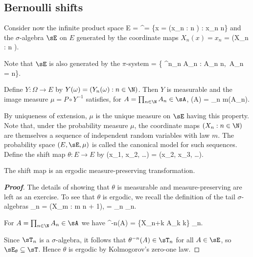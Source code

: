 
\subsection{Bernoulli shifts}


Consider now the infinite product space
\be
E = \R^\N = \{x = (x_n : n \in \N) : x_n \in \R {}n\}
\ee
and the $\sigma$-algebra $\sE$ on $E$ generated by the coordinate maps $X_n(x) = x_n$
\be
\sE = \sigma(X_n : n \in \N).
\ee


Note that $\sE$ is also generated by the $\pi$-system
\be
\sA = \left\{ \prod^n_{n \in\N} A_n : A_n \in \sB {}n,\ A_n = \R {}n\right\}.
\ee

Define $Y : \Omega \to E$ by $Y (\omega) = (Y_n(\omega) : n \in \N)$. Then $Y$ is measurable and the image measure $\mu = P \circ Y^{-1}$ satisfies, for $A = \prod_{n\in\N} A_n \in \sA$,
\be
\mu(A) = \prod_{n\in \N} m(A_n).
\ee

By uniqueness of extension, $\mu$ is the unique measure on $\sE$ having this property. Note that, under the probability measure $\mu$, the coordinate maps $(X_n : n \in \N)$ are themselves a sequence of independent random variables with law $m$. The probability space $(E, \sE, \mu)$ is called the canonical model for such sequences. Define the shift map $\theta : E \to E$ by
\be
\theta(x_1, x_2, \dots ) = (x_2, x_3, \dots ).
\ee

\begin{theorem}\label{thm:measure_preserving}
The shift map is an ergodic measure-preserving transformation.
\end{theorem}
\begin{proof}[\bf Proof]
The details of showing that $\theta$ is measurable and measure-preserving are left as an exercise. To see that $\theta$ is ergodic, we recall the definition of the tail $\sigma$-algebras 
\be
\sT_n = \sigma(X_m : m \geq n + 1), \quad\quad \sT = \bigcap_n \sT_n.
\ee

For $A =\prod_{n\in\N} A_n \in \sA$ we have
\be
\theta^{-n}(A) = \{X_{n+k} \in A_k k\} \in \sT_n.
\ee

Since $\sT_n$ is a $\sigma$-algebra, it follows that $\theta^{-n}(A) \in \sT_n$ for all $A \in \sE$, so $\sE_\theta \subseteq \sT$. Hence $\theta$ is ergodic by Kolmogorov's zero-one law.
\end{proof}
